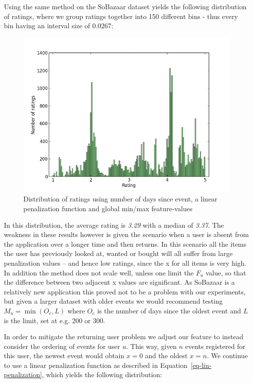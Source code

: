 Using the same method on the SoBazaar dataset yields the following distribution
of ratings, where we group ratings together into 150 different bins - thus
every bin having an interval size of 0.0267:

\begin{figure}[H]
  \centering
  \includegraphics[scale=0.5]{image/dist-recentness-linear-global}
 \caption[Distribution of ratings using number of days since event]{Distribution of ratings using number of days since event, a linear
 penalization function and global min/max feature-values}
  \label{fig:dist-recentness-linear-global}
\end{figure}

In this distribution, the average rating is \textit{3.29} with a median of
\textit{3.37}. The weakness in these results however is given the scenario when
a user is absent from the application over a longer time and then returns. In
this scenario all the items the user has previously looked at, wanted or bought
will all suffer from large penalization values -- and hence low ratings, since
the x for all items is very high. In addition the method does not scale well,
unless one limit the $F_u$ value, so that the difference between two adjacent x
values are significant. As SoBazaar is a relatively new application this proved
not to be a problem with our experiments, but given a larger dataset with older
events we would recommend testing $M_u = \min(O_e, L)$ where $O_e$ is the
number of days since the oldest event and $L$ is the limit, set at e.g. 200 or
300.

In order to mitigate the returning user problem we adjust our feature to
instead consider the ordering of events for user $u$. This way, given $n$
events registered for this user, the newest event would obtain $x=0$ and the
oldest $x=n$. We continue to use a linear penalization function as described in
Equation~\ref{eq-lin-penalization}, which yields the following distribution:

